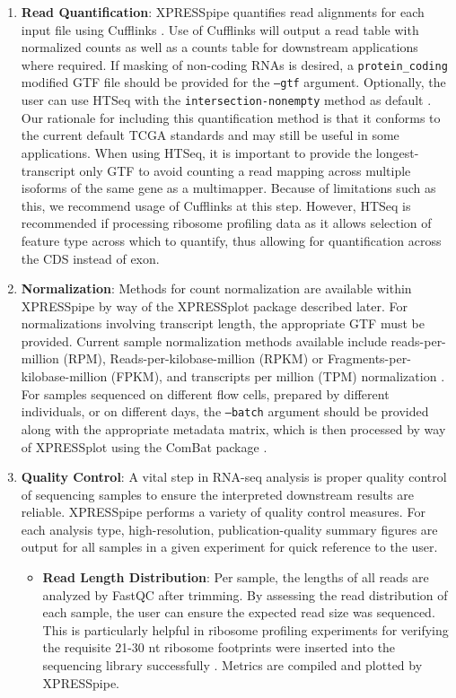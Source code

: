 \documentclass[11pt, a4paper, oneside]{article}
\begin{document}
\begin{enumerate}
  \item \textbf{Read Quantification}: XPRESSpipe quantifies read alignments for each input file using Cufflinks \cite{cufflinks, count_benchmark}. Use of Cufflinks will output a read table with normalized counts as well as a counts table for downstream applications where required. If masking of non-coding RNAs is desired, a \texttt{protein\_coding} modified GTF file should be provided for the \texttt{--gtf} argument. Optionally, the user can use HTSeq with the \texttt{intersection-nonempty} method as default \cite{htseq, count_benchmark}. Our rationale for including this quantification method is that it conforms to the current default TCGA standards and may still be useful in some applications. When using HTSeq, it is important to provide the longest-transcript only GTF to avoid counting a read mapping across multiple isoforms of the same gene as a multimapper. Because of limitations such as this, we recommend usage of Cufflinks at this step. However, HTSeq is recommended if processing ribosome profiling data as it allows selection of feature type across which to quantify, thus allowing for quantification across the CDS instead of exon.
  \item \textbf{Normalization}: Methods for count normalization are available within XPRESSpipe by way of the XPRESSplot package described later. For normalizations involving transcript length, the appropriate GTF must be provided. Current sample normalization methods available include reads-per-million (RPM), Reads-per-kilobase-million (RPKM) or Fragments-per-kilobase-million (FPKM), and transcripts per million (TPM) normalization \cite{evans_briefbio}. For samples sequenced on different flow cells, prepared by different individuals, or on different days, the \texttt{--batch} argument should be provided along with the appropriate metadata matrix, which is then processed by way of XPRESSplot using the ComBat package \cite{sva}.
  \item \textbf{Quality Control}:
  A vital step in RNA-seq analysis is proper quality control of sequencing samples to ensure the interpreted downstream results are reliable. XPRESSpipe performs a variety of quality control measures. For each analysis type, high-resolution, publication-quality summary figures are output for all samples in a given experiment for quick reference to the user.

    \begin{itemize}
      \item \textbf{Read Length Distribution}: Per sample, the lengths of all reads are analyzed by FastQC \cite{fastqc} after trimming. By assessing the read distribution of each sample, the user can ensure the expected read size was sequenced. This is particularly helpful in ribosome profiling experiments for verifying the requisite 21-30 nt ribosome footprints were inserted into the sequencing library successfully \cite{ingolia_meth}. Metrics are compiled and plotted by XPRESSpipe.


\end{itemize}
\end{enumerate}
\end{document}
